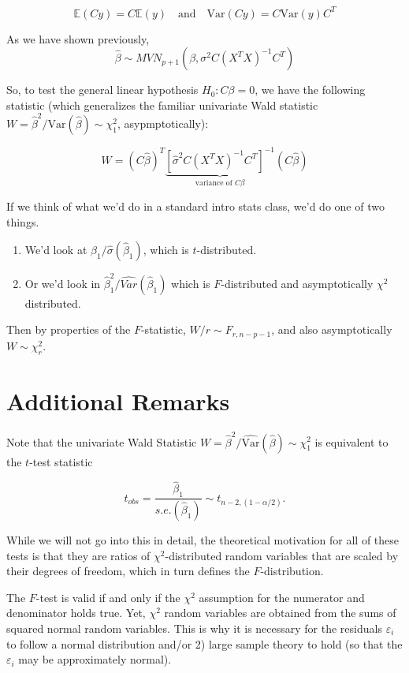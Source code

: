 \documentclass[
  letterpaper,
  DIV=11,
  numbers=noendperiod]{scrreport}
\providecommand{\tightlist}{%
  \setlength{\itemsep}{0pt}\setlength{\parskip}{0pt}}\usepackage{longtable,booktabs,array}
\begin{document}
\[\mathbb E(Cy) = C\mathbb E(y) \quad \text{and} \quad \text{Var}(Cy) = C\text{Var}(y)C^T\]

As we have shown previously,
\[\hat \beta \sim MVN_{p+1} (\beta, \sigma^2 C(X^TX)^{-1}C^T)\]

So, to test the general linear hypothesis \(H_0: C\beta = 0\), we have
the following statistic (which generalizes the familiar univariate Wald
statistic
\(W = \hat \beta^2 / \widehat{\text{Var}}(\hat \beta) \sim \chi^2_1\),
asypmptotically):

\[W = (C\hat \beta)^T\underbrace{[\hat \sigma^2 C(X^TX)^{-1}C^T]^{-1}}_{\text{variance of } C\beta}(C\hat \beta)\]

If we think of what we'd do in a standard intro stats class, we'd do one
of two things.

\begin{enumerate}
\def\labelenumi{\arabic{enumi}.}
\tightlist
\item
  We'd look at \(\hat \beta_1 / \hat \sigma(\hat \beta_1)\), which is
  \(t\)-distributed.
\item
  Or we'd look in \(\hat \beta_1^2/\widehat{Var}(\hat \beta_1)\) which
  is \(F\)-distributed and asymptotically \(\chi^2\) distributed.
\end{enumerate}

Then by properties of the \(F\)-statistic, \(W/r \sim F_{r,n-p-1}\), and
also asymptotically \(W \sim \chi_r^2\).

\hypertarget{additional-remarks}{%
\section{Additional Remarks}\label{additional-remarks}}

Note that the univariate Wald Statistic
\(W = \hat \beta^2 / \widehat{\text{Var}}(\hat \beta) \sim \chi_1^2\) is
equivalent to the \(t\)-test statistic

\[t_{obs} = \frac{\hat \beta_1}{s.e.(\hat\beta_1)} \sim t_{n-2,(1-\alpha/2)}.\]

While we will not go into this in detail, the theoretical motivation for
all of these tests is that they are ratios of \(\chi^2\)-distributed
random variables that are scaled by their degrees of freedom, which in
turn defines the \(F\)-distribution.

The \(F\)-test is valid if and only if the \(\chi^2\) assumption for the
numerator and denominator holds true. Yet, \(\chi^2\) random variables
are obtained from the sums of squared normal random variables. This is
why it is necessary for the residuals \(\varepsilon_i\) to follow a
normal distribution and/or 2) large sample theory to hold (so that the
\(\varepsilon_i\) may be approximately normal).
\end{document}
